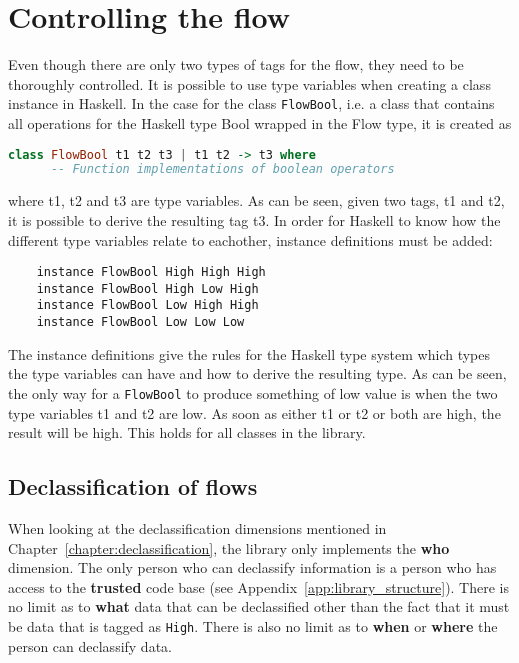 \section{Controlling the flow}
Even though there are only two types of tags for the flow, they need to be thoroughly controlled. It is possible to use type variables when creating a class instance in Haskell. In the case for the class {\tt FlowBool}, i.e. a class that contains all operations for the Haskell type Bool wrapped in the Flow type, it is created as
\begin{center}
  \begin{lstlisting}[language=Haskell]
    class FlowBool t1 t2 t3 | t1 t2 -> t3 where
      -- Function implementations of boolean operators
  \end{lstlisting}
\end{center}
where t1, t2 and t3 are type variables. As can be seen, given two tags, t1 and t2, it is possible to derive the resulting tag t3. In order for Haskell to know how the different type variables relate to eachother, instance definitions must be added:
\begin{verbatim}
    instance FlowBool High High High
    instance FlowBool High Low High
    instance FlowBool Low High High
    instance FlowBool Low Low Low
\end{verbatim}
The instance definitions give the rules for the Haskell type system which types the type variables can have and how to derive the resulting type. As can be seen, the only way for a {\tt FlowBool} to produce something of low value is when the two type variables t1 and t2 are low. As soon as either t1 or t2 or both are high, the result will be high. This holds for all classes in the library.

\subsection{Declassification of flows}
When looking at the declassification dimensions mentioned in Chapter~\ref{chapter:declassification}, the library only implements the \textbf{who} dimension. The only person who can declassify information is a person who has access to the \textbf{trusted} code base (see Appendix~\ref{app:library_structure}). There is no limit as to \textbf{what} data that can be declassified other than the fact that it must be data that is tagged as {\tt High}. There is also no limit as to \textbf{when} or \textbf{where} the person can declassify data.


